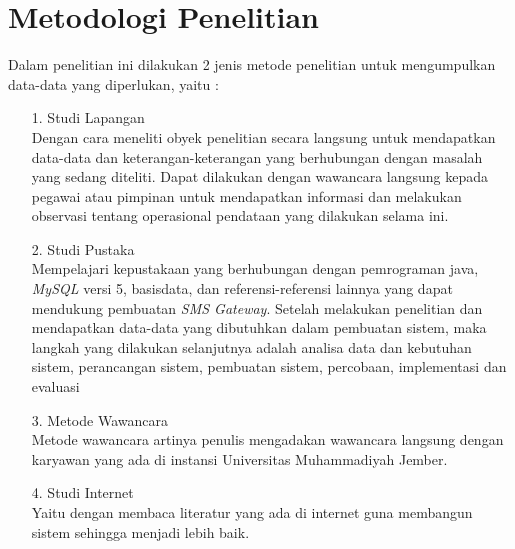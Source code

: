 \documentclass{jtetiproposalskripsi}
\begin{document}
\section{Metodologi Penelitian}
Dalam penelitian ini dilakukan 2 jenis metode penelitian untuk mengumpulkan data-data yang diperlukan, yaitu :
\begin{itemize}
\item[1.]Studi Lapangan
\\
Dengan cara meneliti obyek penelitian secara langsung untuk mendapatkan data-data dan keterangan-keterangan yang berhubungan dengan masalah yang sedang diteliti. Dapat dilakukan dengan wawancara langsung kepada pegawai atau pimpinan untuk mendapatkan informasi dan melakukan observasi tentang operasional pendataan yang dilakukan selama ini.
\item[2.]Studi Pustaka 
\\
Mempelajari kepustakaan yang berhubungan dengan pemrograman java, \textit{MySQL } versi 5, basisdata, dan referensi-referensi lainnya yang dapat mendukung pembuatan \textit{SMS Gateway}. Setelah melakukan penelitian dan mendapatkan data-data yang dibutuhkan dalam pembuatan sistem, maka langkah yang dilakukan selanjutnya adalah analisa data dan kebutuhan sistem, perancangan sistem, pembuatan sistem, percobaan, implementasi dan evaluasi  
\item[3.]Metode Wawancara
\\
Metode wawancara artinya penulis mengadakan wawancara langsung dengan karyawan yang ada di instansi Universitas Muhammadiyah Jember.
\item[4.]Studi Internet
\\
Yaitu dengan membaca literatur yang ada di internet guna membangun sistem sehingga menjadi lebih baik.
\end{itemize}
\end{document}
